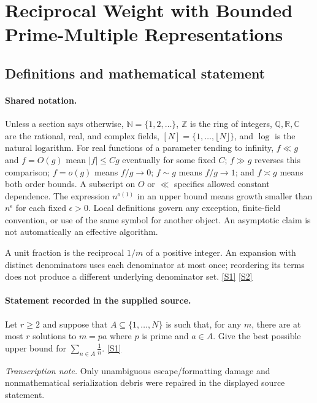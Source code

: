 \documentclass[11pt,a4paper]{article}
\newcommand{\N}{\mathbb{N}}
\newcommand{\Z}{\mathbb{Z}}
\newcommand{\Q}{\mathbb{Q}}
\newcommand{\R}{\mathbb{R}}
\newcommand{\C}{\mathbb{C}}
\newcommand{\sref}[2]{\hyperlink{source:#1:#2}{[S#2]}}
\begin{document}
\section{Reciprocal Weight with Bounded Prime-Multiple Representations}\label{statement}


\subsection{Definitions and mathematical statement}

\paragraph{Shared notation.}Unless a section says otherwise, $\N=\{1,2,\ldots\}$,
$\Z$ is the ring of integers, $\Q,\R,\C$ are the rational, real, and complex
fields, $[N]=\{1,\ldots,\lfloor N\rfloor\}$, and $\log$ is the natural
logarithm. For real functions of a parameter tending to infinity,
$f\ll g$ and $f=O(g)$ mean $|f|\leq Cg$ eventually for some fixed $C$;
$f\gg g$ reverses this comparison; $f=o(g)$ means $f/g\to0$;
$f\sim g$ means $f/g\to1$; and $f\asymp g$ means both order bounds.
A subscript on $O$ or $\ll$ specifies allowed constant dependence.
The expression $n^{o(1)}$ in an upper bound means growth smaller than
$n^\epsilon$ for each fixed $\epsilon>0$. Local definitions govern any
exception, finite-field convention, or use of the same symbol for another
object. An asymptotic claim is not automatically an effective algorithm.



A unit fraction is the reciprocal $1/m$ of a positive integer. An expansion with distinct denominators uses each denominator at most once; reordering its terms does not produce a different underlying denominator set. \sref{statement}{1} \sref{statement}{2}

\paragraph{Statement recorded in the supplied source.}
Let $r\geq 2$ and suppose that $A\subseteq\{1,\ldots,N\}$ is such that, for any $m$, there are at most $r$ solutions to $m=pa$ where $p$ is prime and $a\in A$. Give the best possible upper bound for $ \sum_{n\in A}\frac{1}{n}. $ \sref{statement}{1}

{\small\emph{Transcription note.} Only unambiguous escape/formatting damage and nonmathematical serialization debris were repaired in the displayed source statement.}
\end{document}
